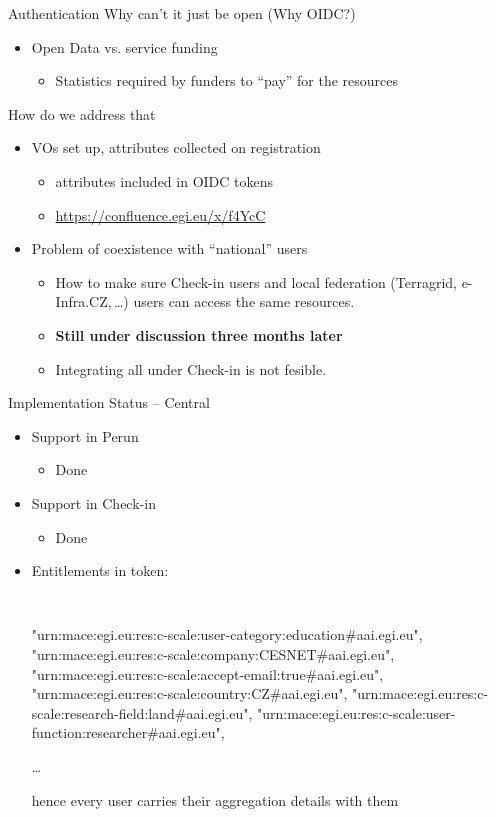 \documentclass[c,aspectratio=169,14pt]{beamer}
\begin{document}
\begin{frame}{Authentication}
Why can't it just be open (Why OIDC?)
\begin{itemize}
\item Open Data vs. service funding
\begin{itemize}
\item Statistics required by funders to “pay” for the resources
\end{itemize}
\end{itemize}
How do we address that
\begin{itemize}
\item VOs set up, attributes collected on registration
\begin{itemize}
\item attributes included in OIDC tokens
\item \url{https://confluence.egi.eu/x/f4YcC}
\end{itemize}
\item Problem of coexistence with ``national'' users
\begin{itemize}
\item How to make sure Check-in users and local federation (Terragrid, e-Infra.CZ,\,\dots) users can access the same resources.
\item \textbf{Still under discussion three months later}
\item Integrating all under Check-in is not fesible.
\end{itemize}
\end{itemize}
\end{frame}


\begin{frame}{Implementation Status -- Central}

\begin{itemize}
\item Support in Perun
\begin{itemize}
\item Done
\end{itemize}
\item Support in Check-in
\begin{itemize}
\item Done
\end{itemize}
\item Entitlements in token:\\

\begin{minipage}{.9\textwidth}
\footnotesize
\tt
        \rule{0pt}{.6cm}"urn:mace:egi.eu:res:c-scale:user-category:education\#aai.egi.eu",
        "urn:mace:egi.eu:res:c-scale:company:CESNET\#aai.egi.eu",
        "urn:mace:egi.eu:res:c-scale:accept-email:true\#aai.egi.eu",
        "urn:mace:egi.eu:res:c-scale:country:CZ\#aai.egi.eu",
        "urn:mace:egi.eu:res:c-scale:research-field:land\#aai.egi.eu",
        "urn:mace:egi.eu:res:c-scale:user-function:researcher\#aai.egi.eu",
\end{minipage}
\item[\dots] \rule{0pt}{.6cm}hence every user carries their aggregation details with them
\end{itemize}

\end{frame}
\end{document}
